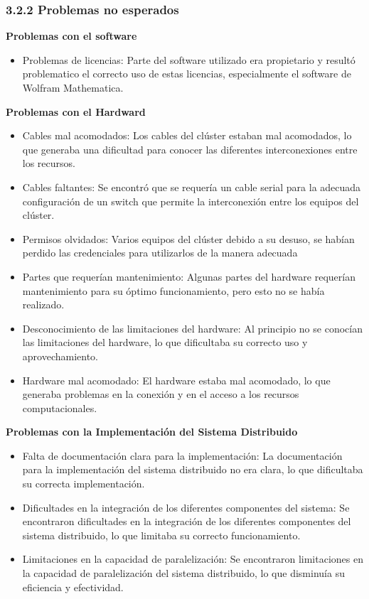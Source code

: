 \begin{doublespace}
\begin{multicols}{2}
    \subsubsection{3.2.2 Problemas no esperados}

    \textbf{Problemas con el software}

    \begin{itemize}
        \item Problemas de licencias: Parte del software utilizado era propietario y resultó problematico el correcto uso de estas licencias, especialmente el software de Wolfram Mathematica.
    \end{itemize}


    \textbf{Problemas con el Hardward}

    \begin{itemize}
        \item Cables mal acomodados: Los cables del clúster estaban mal acomodados, lo que generaba una dificultad para conocer las diferentes interconexiones entre los recursos.
        \item Cables faltantes: Se encontró que se requería un cable serial para la adecuada configuración de un switch que permite la interconexión entre los equipos del clúster.
        \item Permisos olvidados: Varios equipos del clúster debido a su desuso, se habían perdido las credenciales para utilizarlos de la manera adecuada
        \item Partes que requerían mantenimiento: Algunas partes del hardware requerían mantenimiento para su óptimo funcionamiento, pero esto no se había realizado.
        \item Desconocimiento de las limitaciones del hardware: Al principio no se conocían las limitaciones del hardware, lo que dificultaba su correcto uso y aprovechamiento.
        \item Hardware mal acomodado: El hardware estaba mal acomodado, lo que generaba problemas en la conexión y en el acceso a los recursos computacionales.
    \end{itemize}

    \textbf{Problemas con la Implementación del Sistema Distribuido}

    \begin{itemize}
        \item Falta de documentación clara para la implementación: La documentación para la implementación del sistema distribuido no era clara, lo que dificultaba su correcta implementación.
        \item Dificultades en la integración de los diferentes componentes del sistema: Se encontraron dificultades en la integración de los diferentes componentes del sistema distribuido, lo que limitaba su correcto funcionamiento.
        \item Limitaciones en la capacidad de paralelización: Se encontraron limitaciones en la capacidad de paralelización del sistema distribuido, lo que disminuía su eficiencia y efectividad.\newline
    \end{itemize}


\end{multicols}
\end{doublespace}
